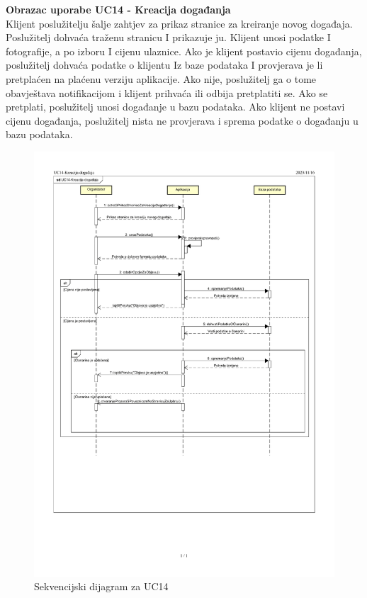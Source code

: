 				
				\eject
				
				
				
				\textbf{\large Obrazac uporabe UC14 - Kreacija događanja}\\
				
				Klijent poslužitelju šalje zahtjev za prikaz stranice za kreiranje novog događaja. Poslužitelj dohvaća traženu stranicu I prikazuje ju. Klijent unosi podatke I fotografije, a po izboru I cijenu ulaznice. Ako je klijent postavio cijenu događanja, poslužitelj dohvaća podatke o klijentu Iz baze podataka I provjerava je li pretplaćen na plaćenu verziju aplikacije. Ako nije, poslužitelj ga o tome obavještava notifikacijom i klijent prihvaća ili odbija pretplatiti se. Ako se pretplati, poslužitelj unosi događanje u bazu podataka. Ako klijent ne postavi cijenu događanja, poslužitelj nista ne provjerava i sprema podatke o događanju u bazu podataka.
				
				\begin{figure}[H]
						\includegraphics[scale=0.7]{slike/uc14-1.PNG} %
						\centering
						\caption{Sekvencijski dijagram za UC14}
						\label{fig:promjene}
				\end{figure}
				

